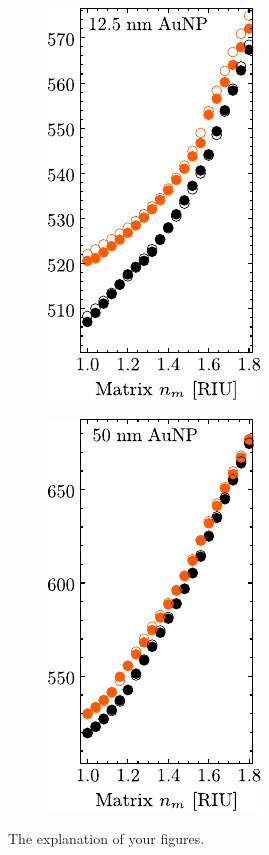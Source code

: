 \begin{figure}[h!]
%
	\hspace*{-.5em}\begin{subfigure}{.05\textwidth}\vspace{-6.35cm}\caption{}\label{sfig:secondaty2}	\end{subfigure}
	\hspace*{-2.45em}
	\begin{subfigure}{.24\textwidth} \includegraphics[scale = 1.02]{1-Theory/figs/redShift_mat1.pdf}\end{subfigure}%
%
	\hspace*{-.45em}\begin{subfigure}{.05\textwidth}\vspace{-6.35cm}\caption{}\label{sfig:secondaty2}	\end{subfigure}
	\hspace*{-2.45em}
	\begin{subfigure}{.24\textwidth} \includegraphics[scale = 1.02]{1-Theory/figs/redShift_mat2.pdf}\end{subfigure}%
\vspace*{-.5em}
\caption[Example of Figure title]{The explanation of your figures. \blindtext}
\label{fig:Main}	
\end{figure}	
